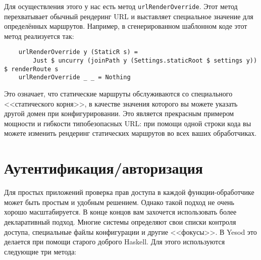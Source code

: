Для осуществления этого у нас есть метод \lstinline!urlRenderOverride!. Этот
метод перехватывает обычный рендеринг URL и выставляет специальное значение для
определённых маршрутов. Например, в сгенерированном шаблонном коде этот метод
реализуется так:

\begin{lstlisting}
    urlRenderOverride y (StaticR s) =
        Just $ uncurry (joinPath y (Settings.staticRoot $ settings y)) $ renderRoute s
    urlRenderOverride _ _ = Nothing
\end{lstlisting}%

Это означает, что статические маршруты обслуживаются со специального
<<статического корня>>, в качестве значения которого вы можете указать другой
домен при конфигурировании. Это является прекрасным примером мощности и
гибкости типобезопасных URL: при помощи одной строки кода вы можете изменить
рендеринг статических маршрутов во всех ваших обработчиках.

\section {Аутентификация/авторизация}

Для простых приложений проверка прав доступа в каждой функции-обработчике может
быть простым и удобным решением. Однако такой подход не очень хорошо
масштабируется. В конце концов вам захочется использовать более декларативный
подход. Многие системы определяют свои списки контроля доступа, специальные
файлы конфигурации и другие <<фокусы>>. В Yesod это делается при помощи старого
доброго Haskell. Для этого используются следующие три метода:

